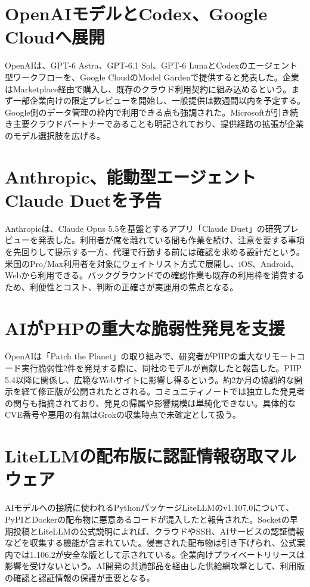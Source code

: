 \section{OpenAIモデルとCodex、Google Cloudへ展開}
OpenAIは、GPT-6 Astra、GPT-6.1 Sol、GPT-6 LunaとCodexのエージェント型ワークフローを、Google CloudのModel Gardenで提供すると発表した。企業はMarketplace経由で購入し、既存のクラウド利用契約に組み込めるという。まず一部企業向けの限定プレビューを開始し、一般提供は数週間以内を予定する。Google側のデータ管理の枠内で利用できる点も強調された。Microsoftが引き続き主要クラウドパートナーであることも明記されており、提供経路の拡張が企業のモデル選択肢を広げる。

\section{Anthropic、能動型エージェントClaude Duetを予告}
Anthropicは、Claude Opus 5.5を基盤とするアプリ「Claude Duet」の研究プレビューを発表した。利用者が席を離れている間も作業を続け、注意を要する事項を先回りして提示する一方、代理で行動する前には確認を求める設計だという。米国のPro/Max利用者を対象にウェイトリスト方式で展開し、iOS、Android、Webから利用できる。バックグラウンドでの確認作業も既存の利用枠を消費するため、利便性とコスト、判断の正確さが実運用の焦点となる。

\section{AIがPHPの重大な脆弱性発見を支援}
OpenAIは「Patch the Planet」の取り組みで、研究者がPHPの重大なリモートコード実行脆弱性2件を発見する際に、同社のモデルが貢献したと報告した。PHP 5.4以降に関係し、広範なWebサイトに影響し得るという。約2か月の協調的な開示を経て修正版が公開されたとされる。コミュニティノートでは独立した発見者の関与も指摘されており、発見の帰属や影響規模は単純化できない。具体的なCVE番号や悪用の有無はGrokの収集時点で未確定として扱う。

\section{LiteLLMの配布版に認証情報窃取マルウェア}
AIモデルへの接続に使われるPythonパッケージLiteLLMのv1.107.0について、PyPIとDockerの配布物に悪意あるコードが混入したと報告された。Socketの早期投稿とLiteLLMの公式説明によれば、クラウドやSSH、AIサービスの認証情報などを収集する機能が含まれていた。侵害された配布物は引き下げられ、公式案内では1.106.2が安全な版として示されている。企業向けプライベートリリースは影響を受けないという。AI開発の共通部品を経由した供給網攻撃として、利用版の確認と認証情報の保護が重要となる。

